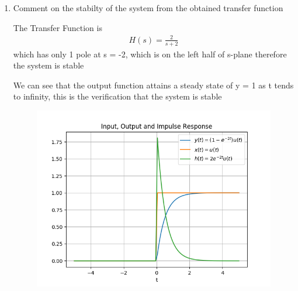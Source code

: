 \begin{enumerate}[label=\thesection.\arabic*.,ref=\thesection.\theenumi]
\item Comment on the stabilty of the system from the obtained transfer function

\solution
The Transfer Function is 
\begin{align}
H(s) = \frac{2}{s+2}
\end{align}
which has only 1 pole at s = -2, which is on the left half of s-plane therefore the system is stable

We can see that the output function attains a steady state of y = 1 as t tends to infinity, this is the verification that the system is stable

\begin{figure}
\centering
\includegraphics[width=\columnwidth]{figs/EE18BTECH11021_fig.png}
\end{figure}
\end{enumerate}